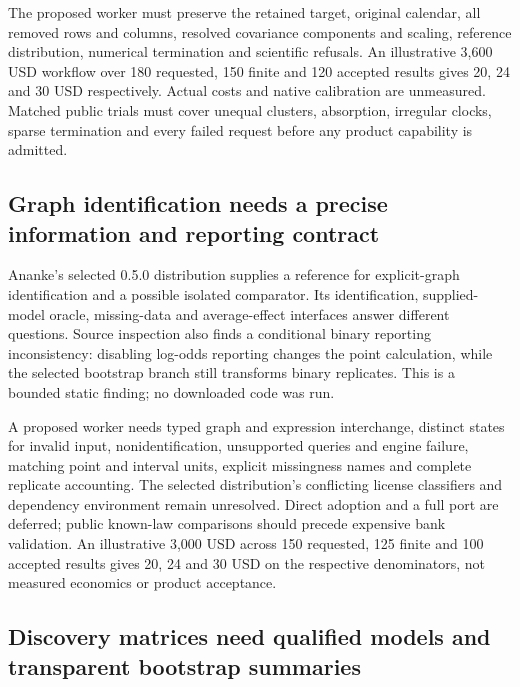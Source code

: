 The proposed worker must preserve the retained target, original
calendar, all removed rows and columns, resolved covariance components
and scaling, reference distribution, numerical termination and
scientific refusals. An illustrative 3,600 USD workflow over 180
requested, 150 finite and 120 accepted results gives 20, 24 and 30 USD
respectively. Actual costs and native calibration are unmeasured.
Matched public trials must cover unequal clusters, absorption, irregular
clocks, sparse termination and every failed request before any product
capability is admitted. \citep{exec24_lmpanel_reference}

\hypertarget{graph-identification-needs-a-precise-information-and-reporting-contract}{%
\subsection{Graph identification needs a precise information and
reporting
contract}\label{graph-identification-needs-a-precise-information-and-reporting-contract}}

Ananke's selected 0.5.0 distribution supplies a reference for
explicit-graph identification and a possible isolated comparator. Its
identification, supplied-model oracle, missing-data and average-effect
interfaces answer different questions. Source inspection also finds a
conditional binary reporting inconsistency: disabling log-odds reporting
changes the point calculation, while the selected bootstrap branch still
transforms binary replicates. This is a bounded static finding; no
downloaded code was run.
\citep{exec24_ananke_source,exec24_ananke_choice}

A proposed worker needs typed graph and expression interchange, distinct
states for invalid input, nonidentification, unsupported queries and
engine failure, matching point and interval units, explicit missingness
names and complete replicate accounting. The selected distribution's
conflicting license classifiers and dependency environment remain
unresolved. Direct adoption and a full port are deferred; public
known-law comparisons should precede expensive bank validation. An
illustrative 3,000 USD across 150 requested, 125 finite and 100 accepted
results gives 20, 24 and 30 USD on the respective denominators, not
measured economics or product acceptance.\citep{exec24_ananke_choice}

\hypertarget{discovery-matrices-need-qualified-models-and-transparent-bootstrap-summaries}{%
\subsection{Discovery matrices need qualified models and transparent
bootstrap
summaries}\label{discovery-matrices-need-qualified-models-and-transparent-bootstrap-summaries}}

